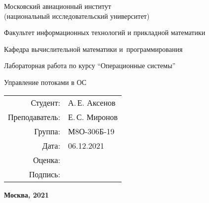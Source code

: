 \begin{titlepage}
\begin{center}
\bfseries

{\Large Московский авиационный институт\\ (национальный исследовательский университет)}

\vspace{48pt}

{\large Факультет информационных технологий и прикладной математики
}

{\large Кафедра вычислительной математики и~программирования}


\vspace{48pt}

Лабораторная работа  по курсу \enquote{Операционные системы}

\vspace{24pt}

{\Large Управление потоками в ОС}

\end{center}

\vspace{72pt}

\begin{flushright}
\begin{tabular}{rl}
Студент: & А.\,Е. Аксенов \\
Преподаватель: & Е.\,С. Миронов  \\
Группа: & М8О-306Б-19 \\
Дата: & 06.12.2021 \\
Оценка: & \\
Подпись: & \\
\end{tabular}
\end{flushright}

\vfill

\begin{center}
\bfseries
Москва, 2021
\end{center}
\end{titlepage}

\pagebreak
